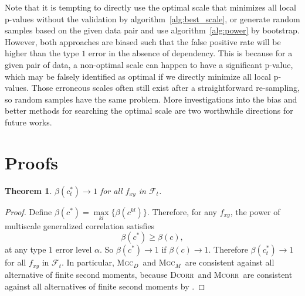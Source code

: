 \documentclass[11pt]{article}
\providecommand{\sct}[1]{{\normalfont\textsc{#1}}}
\providecommand{\mc}[1]{\mathcal{#1}}
\newcommand{\G}{c}
\newcommand{\Mgc}{\sct{Mgc}}
\newcommand{\Mgcd}{\sct{Mgc$_D$}}
\newcommand{\Mgcm}{\sct{Mgc$_M$}}
\newcommand{\Dcorr}{\sct{Dcorr}}
\newcommand{\Mcorr}{\sct{Mcorr}}
\newtheorem{appThm}{Theorem}
\begin{document}
Note that it is tempting to directly use the optimal scale that minimizes all local p-values without the validation by algorithm~\ref{alg:best_scale}, or generate random samples based on the given data pair and use algorithm~\ref{alg:power} by bootstrap. However, both approaches are biased such that the false positive rate will be higher than the type $1$ error in the absence of dependency. This is because for a given pair of data, a non-optimal scale can happen to have a significant p-value, which may be falsely identified as optimal if we directly minimize all local p-values. Those erroneous scales often still exist after a straightforward re-sampling, so random samples have the same problem. More investigations into the bias and better methods for searching the optimal scale are two worthwhile directions for future works.


\section{Proofs}
\label{appen:proofs}
\begin{appThm}
$\beta(\G_t^*) \rightarrow 1$ for all $f_{xy}$ in $\mc{F}_t$.
\end{appThm}
\begin{proof}
Define $\beta(\G^{*})=\underset{kl}{\max}\{\beta(\G^{kl})\}$. Therefore, for any $f_{xy}$, the power of multiscale generalized correlation satisfies
\begin{equation*}
\beta(\G^*) \geq \beta(\G),
\end{equation*}
at any type $1$ error level $\alpha$. So $\beta(\G^{*}) \rightarrow 1$ if $\beta(\G) \rightarrow 1$.
% 
Therefore $\beta(\G_t^*) \rightarrow 1$ for all $f_{xy}$ in $\mc{F}_t$. In particular, \Mgcd~and \Mgcm~are consistent against all alternative of finite second moments, because \Dcorr~and \Mcorr~are consistent against all alternatives of finite second moments by \cite{SzekelyRizzoBakirov2007, SzekelyRizzo2013a}.
\end{proof}
\end{document}
